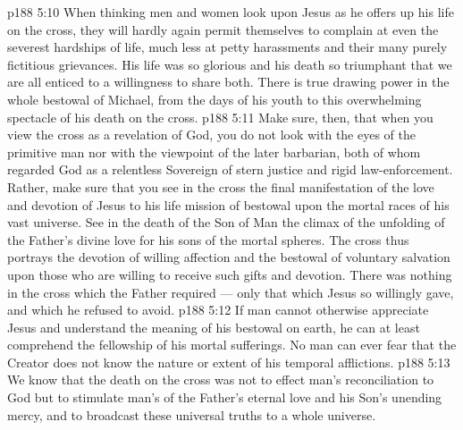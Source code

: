 \vs p188 5:10 When thinking men and women look upon Jesus as he offers up his life on the cross, they will hardly again permit themselves to complain at even the severest hardships of life, much less at petty harassments and their many purely fictitious grievances. His life was so glorious and his death so triumphant that we are all enticed to a willingness to share both. There is true drawing power in the whole bestowal of Michael, from the days of his youth to this overwhelming spectacle of his death on the cross.
\vs p188 5:11 Make sure, then, that when you view the cross as a revelation of God, you do not look with the eyes of the primitive man nor with the viewpoint of the later barbarian, both of whom regarded God as a relentless Sovereign of stern justice and rigid law\hyp{}enforcement. Rather, make sure that you see in the cross the final manifestation of the love and devotion of Jesus to his life mission of bestowal upon the mortal races of his vast universe. See in the death of the Son of Man the climax of the unfolding of the Father’s divine love for his sons of the mortal spheres. The cross thus portrays the devotion of willing affection and the bestowal of voluntary salvation upon those who are willing to receive such gifts and devotion. There was nothing in the cross which the Father required --- only that which Jesus so willingly gave, and which he refused to avoid.
\vs p188 5:12 \pc If man cannot otherwise appreciate Jesus and understand the meaning of his bestowal on earth, he can at least comprehend the fellowship of his mortal sufferings. No man can ever fear that the Creator does not know the nature or extent of his temporal afflictions.
\vs p188 5:13 We know that the death on the cross was not to effect man’s reconciliation to God but to stimulate man’s  of the Father’s eternal love and his Son’s unending mercy, and to broadcast these universal truths to a whole universe.
\quizlink
